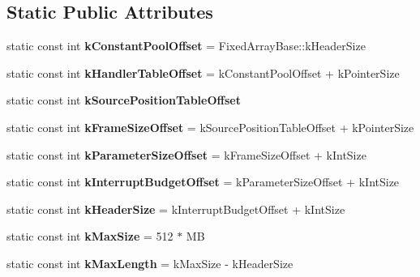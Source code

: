 \subsection*{Static Public Attributes}
\begin{DoxyCompactItemize}
\item 
static const int {\bfseries k\+Constant\+Pool\+Offset} = Fixed\+Array\+Base\+::k\+Header\+Size\hypertarget{classv8_1_1internal_1_1_bytecode_array_a91781d119e10794cf5c2febf07dc0e32}{}\label{classv8_1_1internal_1_1_bytecode_array_a91781d119e10794cf5c2febf07dc0e32}

\item 
static const int {\bfseries k\+Handler\+Table\+Offset} = k\+Constant\+Pool\+Offset + k\+Pointer\+Size\hypertarget{classv8_1_1internal_1_1_bytecode_array_a65d78e205ec182b87d43f72f28932e93}{}\label{classv8_1_1internal_1_1_bytecode_array_a65d78e205ec182b87d43f72f28932e93}

\item 
static const int {\bfseries k\+Source\+Position\+Table\+Offset}
\item 
static const int {\bfseries k\+Frame\+Size\+Offset} = k\+Source\+Position\+Table\+Offset + k\+Pointer\+Size\hypertarget{classv8_1_1internal_1_1_bytecode_array_a651eab802bd9c7d10a413ab74ebe3443}{}\label{classv8_1_1internal_1_1_bytecode_array_a651eab802bd9c7d10a413ab74ebe3443}

\item 
static const int {\bfseries k\+Parameter\+Size\+Offset} = k\+Frame\+Size\+Offset + k\+Int\+Size\hypertarget{classv8_1_1internal_1_1_bytecode_array_a44777175c9a74a6c76e2bcbb092e2a64}{}\label{classv8_1_1internal_1_1_bytecode_array_a44777175c9a74a6c76e2bcbb092e2a64}

\item 
static const int {\bfseries k\+Interrupt\+Budget\+Offset} = k\+Parameter\+Size\+Offset + k\+Int\+Size\hypertarget{classv8_1_1internal_1_1_bytecode_array_ad126cb7c85bc3f16eb559576deea21d3}{}\label{classv8_1_1internal_1_1_bytecode_array_ad126cb7c85bc3f16eb559576deea21d3}

\item 
static const int {\bfseries k\+Header\+Size} = k\+Interrupt\+Budget\+Offset + k\+Int\+Size\hypertarget{classv8_1_1internal_1_1_bytecode_array_aa3ba48a066f5d70f0bd35f961593eaec}{}\label{classv8_1_1internal_1_1_bytecode_array_aa3ba48a066f5d70f0bd35f961593eaec}

\item 
static const int {\bfseries k\+Max\+Size} = 512 $\ast$ MB\hypertarget{classv8_1_1internal_1_1_bytecode_array_ad1cc19e0caa3dd920b2dd14468b60a71}{}\label{classv8_1_1internal_1_1_bytecode_array_ad1cc19e0caa3dd920b2dd14468b60a71}

\item 
static const int {\bfseries k\+Max\+Length} = k\+Max\+Size -\/ k\+Header\+Size\hypertarget{classv8_1_1internal_1_1_bytecode_array_a9b306a4048c3a924e49ff1e4bb02bfe6}{}\label{classv8_1_1internal_1_1_bytecode_array_a9b306a4048c3a924e49ff1e4bb02bfe6}

\end{DoxyCompactItemize}
